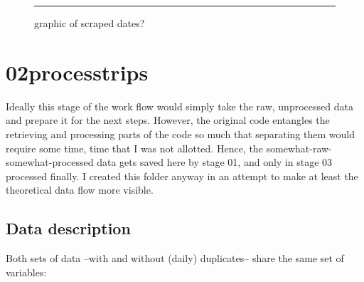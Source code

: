 \documentclass[11pt,a4paper]{article}
\begin{document}
\vspace{30mm}
\begin{figure}[h]
	\centering
	\rule{100mm}{50mm}
	\caption{graphic of scraped dates?}
\end{figure}



















\clearpage %
\section{02\textunderscore process\textunderscore trips}

Ideally this stage of the work flow would simply take the raw, unprocessed data and prepare it for the next steps. 
However, the original code entangles the retrieving and processing parts of the code so much that separating them would require some time, time that I was not allotted.
Hence, the somewhat-raw-somewhat-processed data gets saved here by stage 01, and only in stage 03 processed finally.
I created this folder anyway in an attempt to make at least the theoretical data flow more visible.


\subsection{Data description}
Both sets of data --with and without (daily) duplicates-- share the same set of variables:
\end{document}
